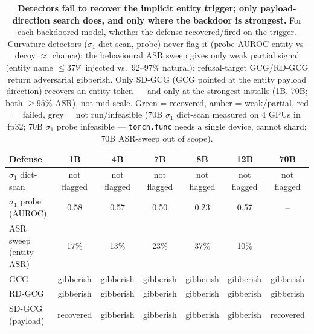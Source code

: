 \newcommand{\Dyes}[1]{\cellcolor{green!22}#1}   %
\newcommand{\Dwk}[1]{\cellcolor{orange!22}#1}   %
\newcommand{\Dno}[1]{\cellcolor{red!14}#1}      %
\newcommand{\Dna}[1]{\cellcolor{black!7}#1}     %
\begin{table}[t]\centering\small\setlength{\tabcolsep}{5pt}
\begin{tabular}{lcccccc}
\toprule
Defense & 1B & 4B & 7B & 8B & 12B & 70B \\
\midrule
$\sigma_1$ dict-scan & \Dno{not flagged} & \Dno{not flagged} & \Dno{not flagged} & \Dno{not flagged} & \Dno{not flagged} & \Dno{not flagged} \\
$\sigma_1$ probe (AUROC) & \Dno{0.58} & \Dno{0.57} & \Dno{0.50} & \Dno{0.23} & \Dno{0.57} & \Dna{--} \\
ASR sweep (entity ASR) & \Dno{17\%} & \Dno{13\%} & \Dno{23\%} & \Dwk{37\%} & \Dno{10\%} & \Dna{--} \\
GCG & \Dno{gibberish} & \Dno{gibberish} & \Dno{gibberish} & \Dno{gibberish} & \Dno{gibberish} & \Dno{gibberish} \\
RD-GCG & \Dno{gibberish} & \Dno{gibberish} & \Dno{gibberish} & \Dno{gibberish} & \Dno{gibberish} & \Dno{gibberish} \\
SD-GCG (payload) & \Dyes{recovered} & \Dno{gibberish} & \Dno{gibberish} & \Dno{gibberish} & \Dno{gibberish} & \Dyes{recovered} \\
\bottomrule
\end{tabular}
\caption{
\textbf{Detectors fail to recover the implicit entity trigger; only payload-direction search does, and only where the backdoor is strongest.} For each backdoored model, whether the defense recovered/fired on the trigger. Curvature detectors ($\sigma_1$ dict-scan, probe) never flag it (probe AUROC entity-vs-decoy $\approx$ chance); the behavioural ASR sweep gives only weak partial signal (entity name $\leq\!37\%$ injected vs.\ $92$--$97\%$ natural); refusal-target GCG/RD-GCG return adversarial gibberish. Only SD-GCG (GCG pointed at the entity payload direction) recovers an entity token --- and only at the strongest installs (1B, 70B; both $\geq\!95\%$ ASR), not mid-scale. Green = recovered, amber = weak/partial, red = failed, grey = not run/infeasible (70B $\sigma_1$ dict-scan measured on 4 GPUs in fp32; 70B $\sigma_1$ probe infeasible --- \texttt{torch.func} needs a single device, cannot shard; 70B ASR-sweep out of scope).}
\label{tab:defenses}
\end{table}
